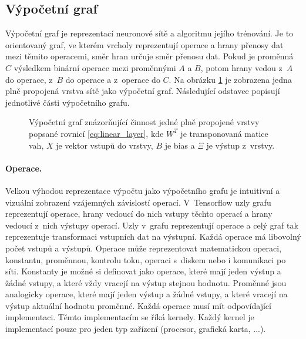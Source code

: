 \subsection{Výpočetní graf}
\label{sub:dfg}

Výpočetní graf je reprezentací neuronové sítě a algoritmu jejího  trénování.
Je to orientovaný graf, ve kterém vrcholy reprezentují operace a hrany přenosy dat mezi těmito operacemi, směr hran určuje směr přenosu dat.
Pokud je proměnná $C$ výsledkem binární operace mezi proměnnými $A$ a $B$, potom hrany vedou z~$A$ do operace, z~$B$ do operace a z~operace do $C$.
Na obrázku \ref{fig:compt_tree} je zobrazena jedna plně propojená vrstva sítě jako výpočetní graf.
Následující odstavce popisují jednotlivé části výpočetního grafu.

\begin{figure}
\centering
{}
\caption{Výpočetní graf znázorňující činnost jedné plně propojené vrstvy popsané rovnicí \ref{eq:linear_layer}, kde $W^T$ je transponovaná matice vah, $X$ je vektor vstupů do vrstvy, $B$ je bias a $\Xi$ je výstup z~vrstvy.}
\label{fig:compt_tree}
\end{figure}

\paragraph{Operace.}
Velkou výhodou reprezentace výpočtu jako výpočetního grafu je intuitivní a vizuální zobrazení vzájemných závislostí operací.
V~Tensorflow uzly grafu reprezentují operace, hrany vedoucí do nich vstupy těchto operací a hrany vedoucí z~nich výstupy operací.
Uzly v~grafu reprezentují operace a celý graf tak reprezentuje transformaci vstupních dat na výstupní.
Každá operace má libovolný počet vstupů a výstupů.
Operace může reprezentovat matematickou operaci, konstantu, proměnnou, kontrolu toku, operaci s~diskem nebo i komunikaci po síti.
Konstanty je možné si definovat jako operace, které mají jeden výstup a žádné vstupy, a které vždy vracejí na výstup stejnou hodnotu.
Proměnné jsou analogicky operace, které mají jeden výstup a žádné vstupy, a které vracejí na výstup aktuální hodnotu proměnné.
Každá operace musí mít odpovídající implementaci.
Těmto implementacím se říká kernely.
Každý kernel je implementací pouze pro jeden typ zařízení (procesor, grafická karta, ...).

